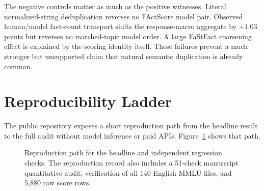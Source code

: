 \documentclass[conference]{IEEEtran}
\begin{document}
The negative controls matter as much as the positive witnesses. Literal normalized-string deduplication reverses no FActScore model pair. Observed human/model fact-count transport shifts the response-macro aggregate by $+1.03$ points but reverses no matched-topic model order. A large FaStFact coarsening effect is explained by the scoring identity itself. These failures prevent a much stronger but unsupported claim that natural semantic duplication is already common.

\Needspace{0.42\textheight}
\section{Reproducibility Ladder}
The public repository exposes a short reproduction path from the headline result to the full audit without model inference or paid APIs. Figure~\ref{fig:repro} shows that path.

\begin{figure}[H]
\centering
{}
\caption{Reproduction path for the headline and independent regression checks. The reproduction record also includes a 51-check manuscript quantitative audit, verification of all 140 English MMLU files, and 5,880 raw score rows.}
\label{fig:repro}
\end{figure}
\end{document}
